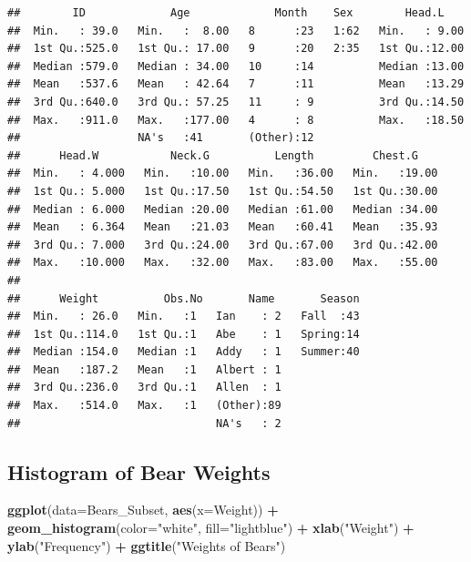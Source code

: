 \documentclass[]{book}
\newenvironment{Shaded}{\begin{snugshade}}{\end{snugshade}}
\newcommand{\KeywordTok}[1]{\textcolor[rgb]{0.13,0.29,0.53}{\textbf{#1}}}
\newcommand{\DataTypeTok}[1]{\textcolor[rgb]{0.13,0.29,0.53}{#1}}
\newcommand{\StringTok}[1]{\textcolor[rgb]{0.31,0.60,0.02}{#1}}
\newcommand{\OperatorTok}[1]{\textcolor[rgb]{0.81,0.36,0.00}{\textbf{#1}}}
\newcommand{\NormalTok}[1]{#1}
\begin{document}
\begin{verbatim}
##        ID             Age             Month    Sex        Head.L     
##  Min.   : 39.0   Min.   :  8.00   8      :23   1:62   Min.   : 9.00  
##  1st Qu.:525.0   1st Qu.: 17.00   9      :20   2:35   1st Qu.:12.00  
##  Median :579.0   Median : 34.00   10     :14          Median :13.00  
##  Mean   :537.6   Mean   : 42.64   7      :11          Mean   :13.29  
##  3rd Qu.:640.0   3rd Qu.: 57.25   11     : 9          3rd Qu.:14.50  
##  Max.   :911.0   Max.   :177.00   4      : 8          Max.   :18.50  
##                  NA's   :41       (Other):12                         
##      Head.W           Neck.G          Length         Chest.G     
##  Min.   : 4.000   Min.   :10.00   Min.   :36.00   Min.   :19.00  
##  1st Qu.: 5.000   1st Qu.:17.50   1st Qu.:54.50   1st Qu.:30.00  
##  Median : 6.000   Median :20.00   Median :61.00   Median :34.00  
##  Mean   : 6.364   Mean   :21.03   Mean   :60.41   Mean   :35.93  
##  3rd Qu.: 7.000   3rd Qu.:24.00   3rd Qu.:67.00   3rd Qu.:42.00  
##  Max.   :10.000   Max.   :32.00   Max.   :83.00   Max.   :55.00  
##                                                                  
##      Weight          Obs.No       Name       Season  
##  Min.   : 26.0   Min.   :1   Ian    : 2   Fall  :43  
##  1st Qu.:114.0   1st Qu.:1   Abe    : 1   Spring:14  
##  Median :154.0   Median :1   Addy   : 1   Summer:40  
##  Mean   :187.2   Mean   :1   Albert : 1              
##  3rd Qu.:236.0   3rd Qu.:1   Allen  : 1              
##  Max.   :514.0   Max.   :1   (Other):89              
##                              NA's   : 2
\end{verbatim}

\subsection{Histogram of Bear Weights}\label{histogram-of-bear-weights}

\begin{Shaded}
\begin{Highlighting}[]
\KeywordTok{ggplot}\NormalTok{(}\DataTypeTok{data=}\NormalTok{Bears_Subset, }\KeywordTok{aes}\NormalTok{(}\DataTypeTok{x=}\NormalTok{Weight)) }\OperatorTok{+}\StringTok{ }
\StringTok{  }\KeywordTok{geom_histogram}\NormalTok{(}\DataTypeTok{color=}\StringTok{"white"}\NormalTok{, }\DataTypeTok{fill=}\StringTok{"lightblue"}\NormalTok{) }\OperatorTok{+}\StringTok{ }
\StringTok{  }\KeywordTok{xlab}\NormalTok{(}\StringTok{"Weight"}\NormalTok{) }\OperatorTok{+}\StringTok{ }\KeywordTok{ylab}\NormalTok{(}\StringTok{"Frequency"}\NormalTok{) }\OperatorTok{+}\StringTok{ }\KeywordTok{ggtitle}\NormalTok{(}\StringTok{"Weights of Bears"}\NormalTok{)}
\end{Highlighting}
\end{Shaded}
\end{document}
